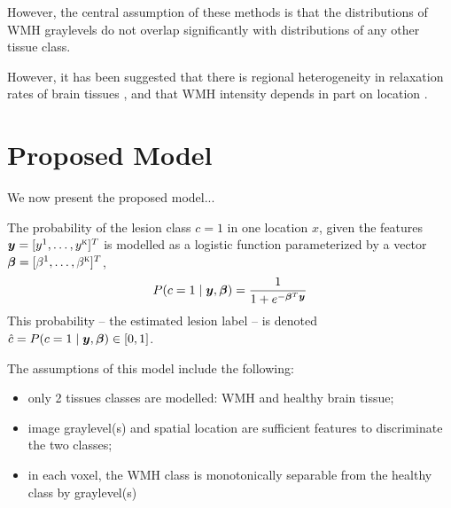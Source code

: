 However, the central assumption of these methods is that the distributions of WMH graylevels do not overlap significantly with distributions of any other tissue class.

However, it has been suggested that there is regional heterogeneity in relaxation rates of brain tissues \cite{Sled2004}, and that WMH intensity depends in part on location \cite{Stevenson2000}.

\section{Proposed Model}
We now present the proposed model...
\par
The probability of the lesion class $c=1$ in one location $x$, given the features $\bm{y} = [y^1,\dots,y^{\textsc{k}}]^T$  is modelled as a logistic function parameterized by a vector $\bm{\beta} = [\beta^1,\dots,\beta^{\textsc{k}}]^T$,
\begin{equation}
  P(c=1\mid\bm{y},\bm{\beta}) = \frac{1}{1+e^{-\bm{\beta}^T\bm{y}}}
  \label{eq:model}
\end{equation}
This probability -- the estimated lesion label -- is denoted $\hat{c} = P(c=1\mid\bm{y},\bm{\beta}) \in [0,1]$.
\par
The assumptions of this model include the following:
\begin{itemize}[itemsep=0pt]
  \item only 2 tissues classes are modelled: WMH and healthy brain tissue;
  \item image graylevel(s) and spatial location are sufficient features to discriminate the two classes;
  \item in each voxel, the WMH class is monotonically separable from the healthy class by graylevel(s)
\end{itemize}
